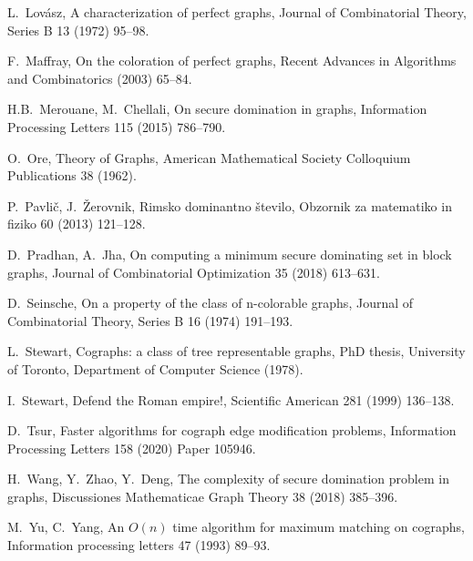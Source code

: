 \documentclass[12pt,a4paper,twoside]{article}
\theoremstyle{definition} %
\theoremstyle{plain} %
\numberwithin{equation}{section}  %
\begin{document}
\begin{thebibliography}{99}
    L.~Lovász,
    A characterization of perfect graphs,
    Journal of Combinatorial Theory, Series B 13 (1972) 95--98.
    
    F.~Maffray,
    On the coloration of perfect graphs,
    Recent Advances in Algorithms and Combinatorics (2003) 65--84.
 
    H.B.~Merouane, M.~Chellali,
    On secure domination in graphs,
    Information Processing Letters 115 (2015) 786--790.
    
    O.~Ore,
    Theory of Graphs,
    American Mathematical Society Colloquium Publications 38 (1962).

    P.~Pavlič, J.~Žerovnik,
    Rimsko dominantno število,
    Obzornik za matematiko in fiziko 60 (2013) 121--128.
    
    D.~Pradhan, A.~Jha,
    On computing a minimum secure dominating set in block graphs,
    Journal of Combinatorial Optimization 35 (2018) 613--631.
    
    D.~Seinsche,
    On a property of the class of n-colorable graphs,
    Journal of Combinatorial Theory, Series B 16 (1974) 191--193.
    
    L.~Stewart,
    Cographs: a class of tree representable graphs,
    PhD thesis,
    University of Toronto, Department of Computer Science (1978).
    
    I.~Stewart,
    Defend the Roman empire!,
    Scientific American 281 (1999) 136--138.
    
    D.~Tsur,
    Faster algorithms for cograph edge modification problems,
    Information Processing Letters 158 (2020) Paper 105946. 

    H.~Wang, Y.~Zhao, Y.~Deng,
    The complexity of secure domination problem in graphs,
    Discussiones Mathematicae Graph Theory 38 (2018) 385--396.
    
    M.~Yu, C.~Yang,
    An $O(n)$ time algorithm for maximum matching on cographs,
    Information processing letters 47 (1993) 89--93.
    
\end{thebibliography}



\cleardoublepage                           %
\printindex
\end{document}
